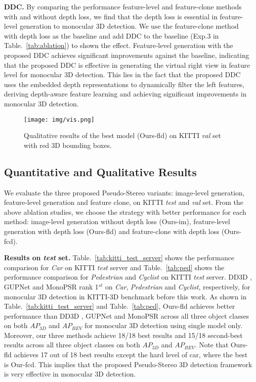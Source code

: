 \documentclass[10pt,twocolumn,letterpaper]{article}
\begin{document}
\noindent\textbf{DDC.} By comparing the performance feature-level and feature-clone methods with and without depth loss, we find that the depth loss is essential in feature-level generation to monocular 3D detection. We use the feature-clone method with depth loss as the baseline and add DDC to the baseline (Exp.3 in Table.~\ref{tab:ablation}) to shown the effect. Feature-level generation with the proposed DDC achieves significant improvements against the baseline, indicating that the proposed DDC is effective in generating the virtual right view in feature level for monocular 3D detection. This lies in the fact that the proposed DDC uses the embedded depth representations to dynamically filter the left features, deriving depth-aware feature learning and achieving significant improvements in monocular 3D detection.



\begin{figure*}[t!]
  \centering
 \texttt{[image: img/vis.png]}
 \vspace{-4mm}
  \caption{Qualitative results of the best model (Ours-fld) on KITTI \emph{val} set with red 3D bounding boxes.} 
 \label{fig:result}
 \vspace{-2mm}
\end{figure*} 

\subsection{Quantitative and Qualitative Results}
We evaluate the three proposed Pseudo-Stereo variants: image-level generation, feature-level generation and feature clone, on KITTI \emph{test} and \emph{val} set. 
From the above ablation studies, we choose the strategy with better performance for each method: image-level generation without depth loss (Ours-im), feature-level generation with depth loss (Ours-fld) and feature-clone with depth loss (Ours-fcd).

\noindent\textbf{Results on \emph{test} set.} Table.~\ref{tab:kitti_test_server} shows the performance comparison for \emph{Car} on KITTI \emph{test} server and Table.~\ref{tab:ped} shows the performance comparison for \emph{Pedestrian} and \emph{Cyclist} on KITTI \emph{test} server. DD3D \cite{park2021pseudo}, GUPNet \cite{lu2021geometry} and MonoPSR \cite{ku2019monocular} rank 1$^{st}$ on \emph{Car}, \emph{Pedestrian} and \emph{Cyclist}, respectively, for monocular 3D detection in KITTI-3D benchmark before this work. As shown in Table.~\ref{tab:kitti_test_server} and Table.~\ref{tab:ped}, Ours-fld achieves better performance than DD3D \cite{park2021pseudo}, GUPNet \cite{lu2021geometry} and MonoPSR \cite{ku2019monocular} across all three object classes on both $AP_{3D}$ and $AP_{BEV}$ for monocular 3D detection using single model only. Moreover, our three methods achieve 18/18 best results and 15/18 second-best results across all three object classes on both $AP_{3D}$ and $AP_{BEV}$. Note that Ours-fld achieves 17 out of 18 best results except the hard level of car, where the best is Our-fcd. This implies that the proposed Pseudo-Stereo 3D detection framework is very effective in monocular 3D detection. 
\end{document}
